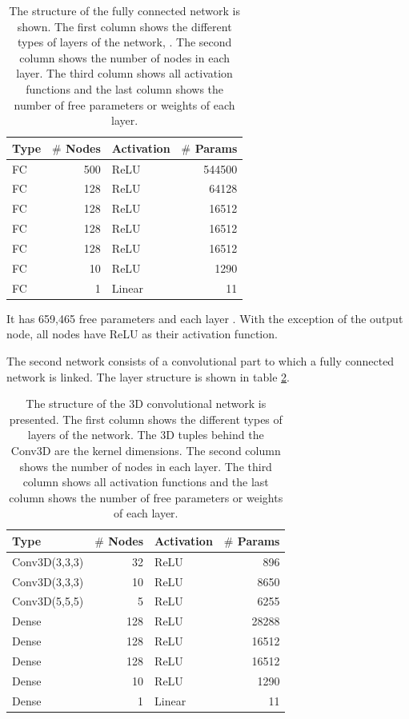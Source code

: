 \documentclass[12pt, a4paper]{thesis}
\begin{document}
\begin{table}[htbp]
  \centering
  \begin{tabular}{lrlr}
    Type & \(\#\) Nodes & Activation & \(\#\) Params\\
    \hline
    FC & 500 & ReLU & 544500\\
    FC & 128 & ReLU & 64128\\
    FC & 128 & ReLU & 16512\\
    FC & 128 & ReLU & 16512\\
    FC & 128 & ReLU & 16512\\
    FC & 10 & ReLU & 1290\\
    FC & 1 & Linear & 11\\
  \end{tabular}
  \caption{The structure of the fully connected network is shown. The
    first column shows the different types of layers of the network,
    . The second column shows the number of nodes in each
    layer. The third column shows all activation functions and the
    last column shows the number of free parameters or weights of each
    layer.}
  \label{fcn_structure}
\end{table}


It has 659,465 free parameters and each layer . With the exception of the output node, all nodes
have ReLU as their activation function.

The second network consists of a convolutional part to which a fully
connected network is linked. The layer structure is shown in table
\ref{conv_structure}.

\begin{table}[htbp]
  \centering
  \begin{tabular}{lrlr}
    Type & \(\#\) Nodes & Activation & \(\#\) Params\\
    \hline
    Conv3D(3,3,3) & 32 & ReLU & 896\\
    Conv3D(3,3,3) & 10 & ReLU & 8650\\
    Conv3D(5,5,5) & 5 & ReLU & 6255\\
    Dense & 128 & ReLU & 28288\\
    Dense & 128 & ReLU & 16512\\
    Dense & 128 & ReLU & 16512\\
    Dense & 10 & ReLU & 1290\\
    Dense & 1 & Linear & 11\\
  \end{tabular}

  \caption{The structure of the 3D convolutional network is
    presented. The first column shows the different types of layers of
    the network. The 3D tuples behind the Conv3D are the kernel
    dimensions. The second column shows the number of nodes in each
    layer. The third column shows all activation functions and the
    last column shows the number of free parameters or weights of each
    layer.}
  \label{conv_structure}
\end{table}
\end{document}
